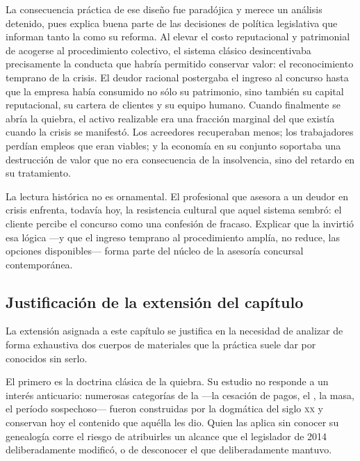 La consecuencia práctica de ese diseño fue paradójica y merece un análisis detenido, pues
explica buena parte de las decisiones de política legislativa que informan tanto la
\LIR{} como su reforma. Al elevar el costo reputacional y patrimonial de acogerse al
procedimiento colectivo, el sistema clásico desincentivaba precisamente la conducta que
habría permitido conservar valor: el reconocimiento temprano de la crisis. El deudor
racional postergaba el ingreso al concurso hasta que la empresa había consumido no sólo
su patrimonio, sino también su capital reputacional, su cartera de clientes y su equipo
humano. Cuando finalmente se abría la quiebra, el activo realizable era una fracción
marginal del que existía cuando la crisis se manifestó. Los acreedores recuperaban
menos; los trabajadores perdían empleos que eran viables; y la economía en su conjunto
soportaba una destrucción de valor que no era consecuencia de la insolvencia, sino del
retardo en su tratamiento.

\begin{practica}
La lectura histórica no es ornamental. El profesional que asesora a un deudor en crisis
enfrenta, todavía hoy, la resistencia cultural que aquel sistema sembró: el cliente
percibe el concurso como una confesión de fracaso. Explicar que la \LIR{} invirtió esa
lógica ---y que el ingreso temprano al procedimiento amplía, no reduce, las opciones
disponibles--- forma parte del núcleo de la asesoría concursal contemporánea.
\end{practica}

\subsection{Justificación de la extensión del capítulo}

La extensión asignada a este capítulo se justifica en la necesidad de analizar de forma
exhaustiva dos cuerpos de materiales que la práctica suele dar por conocidos sin serlo.

El primero es la doctrina clásica de la quiebra. Su estudio no responde a un interés
anticuario: numerosas categorías de la \LIR{} ---la cesación de pagos, el
\desasimiento{}, la masa, el período sospechoso--- fueron construidas por la dogmática
del siglo \textsc{xx} y conservan hoy el contenido que aquélla les dio. Quien las aplica
sin conocer su genealogía corre el riesgo de atribuirles un alcance que el legislador de
2014 deliberadamente modificó, o de desconocer el que deliberadamente mantuvo.

